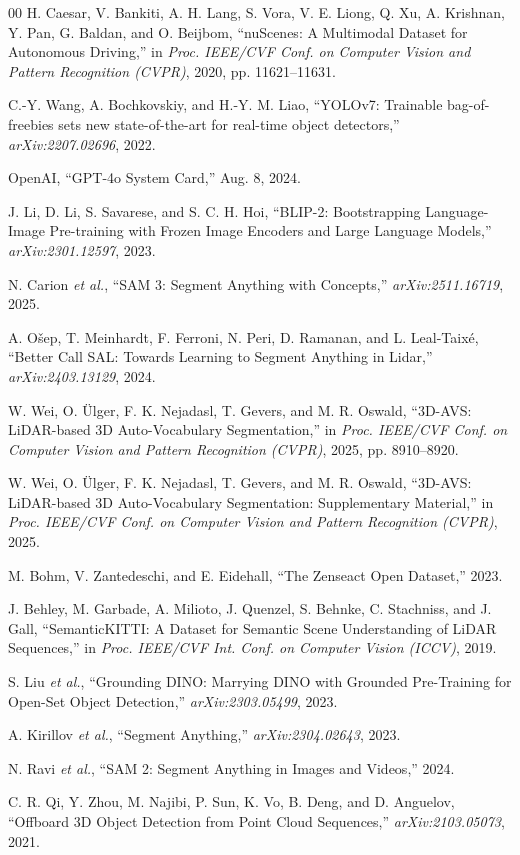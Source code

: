 \documentclass[conference]{IEEEtran}
\begin{document}
\sloppy
\setlength{\emergencystretch}{1em}
\begin{thebibliography}{00}
H. Caesar, V. Bankiti, A. H. Lang, S. Vora, V. E. Liong, Q. Xu, A. Krishnan, Y. Pan, G. Baldan, and O. Beijbom, ``nuScenes: A Multimodal Dataset for Autonomous Driving,'' in \emph{Proc. IEEE/CVF Conf. on Computer Vision and Pattern Recognition (CVPR)}, 2020, pp. 11621--11631.

C.-Y. Wang, A. Bochkovskiy, and H.-Y. M. Liao, ``YOLOv7: Trainable bag-of-freebies sets new state-of-the-art for real-time object detectors,'' \emph{arXiv:2207.02696}, 2022.

OpenAI, ``GPT-4o System Card,'' Aug. 8, 2024.

J. Li, D. Li, S. Savarese, and S. C. H. Hoi, ``BLIP-2: Bootstrapping Language-Image Pre-training with Frozen Image Encoders and Large Language Models,'' \emph{arXiv:2301.12597}, 2023.

N. Carion \emph{et al.}, ``SAM 3: Segment Anything with Concepts,'' \emph{arXiv:2511.16719}, 2025.

A. O\v{s}ep, T. Meinhardt, F. Ferroni, N. Peri, D. Ramanan, and L. Leal-Taix\'e, ``Better Call SAL: Towards Learning to Segment Anything in Lidar,'' \emph{arXiv:2403.13129}, 2024.

W. Wei, O. \"Ulger, F. K. Nejadasl, T. Gevers, and M. R. Oswald, ``3D-AVS: LiDAR-based 3D Auto-Vocabulary Segmentation,'' in \emph{Proc. IEEE/CVF Conf. on Computer Vision and Pattern Recognition (CVPR)}, 2025, pp. 8910--8920.

W. Wei, O. \"Ulger, F. K. Nejadasl, T. Gevers, and M. R. Oswald, ``3D-AVS: LiDAR-based 3D Auto-Vocabulary Segmentation: Supplementary Material,'' in \emph{Proc. IEEE/CVF Conf. on Computer Vision and Pattern Recognition (CVPR)}, 2025.

M. Bohm, V. Zantedeschi, and E. Eidehall, ``The Zenseact Open Dataset,'' 2023.

J. Behley, M. Garbade, A. Milioto, J. Quenzel, S. Behnke, C. Stachniss, and J. Gall, ``SemanticKITTI: A Dataset for Semantic Scene Understanding of LiDAR Sequences,'' in \emph{Proc. IEEE/CVF Int. Conf. on Computer Vision (ICCV)}, 2019.

S. Liu \emph{et al.}, ``Grounding DINO: Marrying DINO with Grounded Pre-Training for Open-Set Object Detection,'' \emph{arXiv:2303.05499}, 2023.

A. Kirillov \emph{et al.}, ``Segment Anything,'' \emph{arXiv:2304.02643}, 2023.

N. Ravi \emph{et al.}, ``SAM 2: Segment Anything in Images and Videos,'' 2024.

C. R. Qi, Y. Zhou, M. Najibi, P. Sun, K. Vo, B. Deng, and D. Anguelov, ``Offboard 3D Object Detection from Point Cloud Sequences,'' \emph{arXiv:2103.05073}, 2021.
\end{thebibliography}
\end{document}
